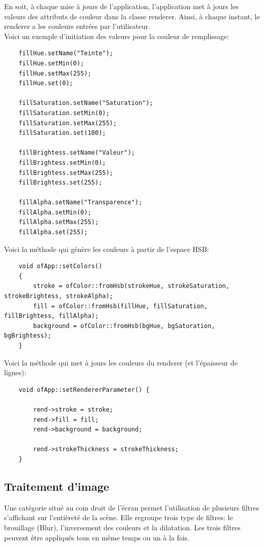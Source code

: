  En soit, à chaque mise à jours de l'application, l'application met à jours les valeurs des attributs de couleur dans la classe renderer. Ainsi, à chaque instant, le renderer a les couleurs entrées par l'utilisateur.\\
 
 Voici un exemple d'initiation des valeurs pour la couleur de remplissage:
 \begin{lstlisting}
 	fillHue.setName("Teinte");
 	fillHue.setMin(0);
 	fillHue.setMax(255);
 	fillHue.set(0);
 
 	fillSaturation.setName("Saturation");
 	fillSaturation.setMin(0);
 	fillSaturation.setMax(255);
 	fillSaturation.set(100);
 
 	fillBrightess.setName("Valeur");
 	fillBrightess.setMin(0);
	fillBrightess.setMax(255);
	fillBrightess.set(255);
 
 	fillAlpha.setName("Transparence");
 	fillAlpha.setMin(0);
 	fillAlpha.setMax(255);
 	fillAlpha.set(255);
 \end{lstlisting} 

Voici la méthode qui génère les couleurs à partir de l'espace HSB:
\begin{lstlisting}
	void ofApp::setColors()
	{
		stroke = ofColor::fromHsb(strokeHue, strokeSaturation, strokeBrightess, strokeAlpha);
		fill = ofColor::fromHsb(fillHue, fillSaturation, fillBrightess, fillAlpha);
		background = ofColor::fromHsb(bgHue, bgSaturation, bgBrightess);
	}
\end{lstlisting} 

Voici la méthode qui met à jours les couleurs du renderer (et l'épaisseur de lignes):
\begin{lstlisting}
	void ofApp::setRendererParameter() {
		
		rend->stroke = stroke;
		rend->fill = fill;
		rend->background = background;
		
		rend->strokeThickness = strokeThickness;
	}
\end{lstlisting}


\subsection{Traitement d'image}
Une catégorie situé au coin droit de l’écran permet l’utilisation de plusieurs filtres s’affichant sur l’entièreté de la scène. Elle regroupe trois type de filtres: le brouillage (Blur), l’inversement des couleurs et la dilatation. Les trois filtres peuvent être appliqués tous en même temps ou un à la fois.\\

